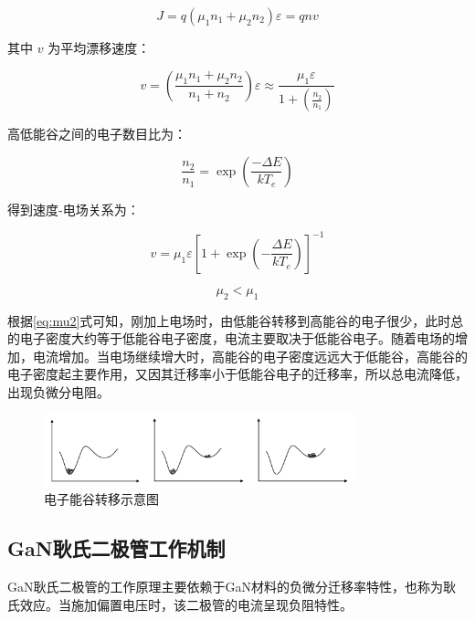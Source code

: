 \documentclass[12pt,hyperref,a4paper,UTF8]{ctexart}
\begin{document}
\begin{equation}
J = q(\mu_1 n_1 + \mu_2 n_2)\varepsilon = q n v 
\end{equation}

其中 $v$ 为平均漂移速度：

\begin{equation}
v = \left(\frac{\mu_1 n_1 + \mu_2 n_2}{n_1 + n_2}\right)\varepsilon \approx \frac{\mu_1 \varepsilon}{1 + \left(\frac{n_2}{n_1}\right)} 
\end{equation}

高低能谷之间的电子数目比为：

\begin{equation}
\frac{n_2}{n_1} = \exp\left(\frac{-\Delta E}{k T_e}\right) 
\end{equation}

得到速度-电场关系为：

\begin{equation}
v = \mu_1 \varepsilon \left[1 + \exp\left(-\frac{\Delta E}{k T_e}\right)\right]^{-1} 
\label{eq:mu2}
\end{equation}

\begin{equation}
\mu_2 < \mu_1 
\end{equation}

根据\ref{eq:mu2}式可知，刚加上电场时，由低能谷转移到高能谷的电子很少，此时总的电子密度大约等于低能谷电子密度，电流主要取决于低能谷电子。随着电场的增加，电流增加。当电场继续增大时，高能谷的电子密度远远大于低能谷，高能谷的电子密度起主要作用，又因其迁移率小于低能谷电子的迁移率，所以总电流降低，出现负微分电阻。



\begin{figure}[H]
\centering
\includegraphics[width=0.8\textwidth]{figures/fig/image4.png}
\caption{电子能谷转移示意图\cite{1014319533.nh}} 
\label{fig:image4}
\end{figure}

\subsection{GaN耿氏二极管工作机制}

GaN耿氏二极管的工作原理主要依赖于GaN材料的负微分迁移率特性，也称为耿氏效应。当施加偏置电压时，该二极管的电流呈现负阻特性。
\end{document}
